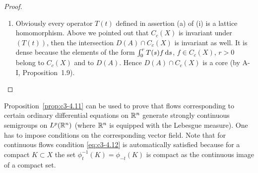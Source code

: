 \begin{proof}
\begin{enumerate}[\upshape (i), wide, labelindent=.5em, start=2]
\item
Obviously every operator $T(t)$ defined in assertion (a) of (i)
is a lattice homomorphism. Above we pointed out that $C_c(X)$ is
invariant under $(T(t))$, then the intersection $D(A) \cap C_c(X)$ is invariant as well. It
is dense because the elements of the form $\int_{0}^{r} T(s)f \mathop{}\!\mathrm{d}{s}$, $f \in C_c(X)$,
$r > 0$ belong to $C_c(X)$ and to $D(A)$. Hence $D(A) \cap C_c(X)$ is a core
(by A-I, Proposition~1.9).
\end{enumerate}

\end{proof}
Proposition~\ref{prop:c3-4.11} can be used to prove that flows corresponding to certain
ordinary differential equations on $\mathbb{R} ^n$ generate strongly continuous
semigroups on $L^p(\mathbb{R} ^n)$ (where $\mathbb{R} ^n$ is equipped with the Lebesgue
measure). One has to impose conditions on the corresponding vector
field. Note that for continuous flows condition \eqref{eq:c3-4.12} is automatically satisfied because for a compact $K \subset X$ the set $\phi_t^{-1}(K) = \phi_{-t}(K)$
is compact as the continuous image of a compact set.

